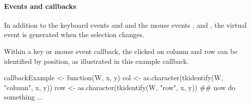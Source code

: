 \paragraph{Events and callbacks}
In addition to the keyboard events  and
 and the mouse events ,
 and , the virtual event
 is generated when the selection changes.

Within a key or mouse event callback, the clicked on column and row can
be identified by position, as illustrated in this example callback.
\begin{Schunk}
\begin{Sinput}
 callbackExample <- function(W, x, y) {
   col <- as.character(tkidentify(W, "column", x, y))
   row <- as.character(tkidentify(W, "row", x, y))
   ## now do something ...
 }
\end{Sinput}
\end{Schunk}



